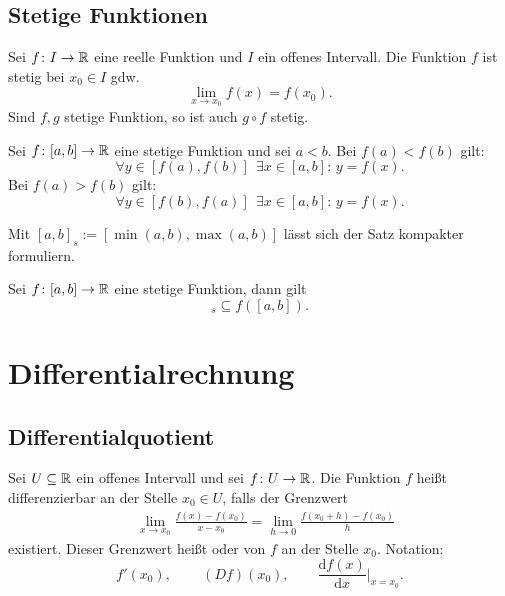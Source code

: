 \subsection{Stetige Funktionen}
Sei $f\colon I\to\mathbb R$ eine reelle Funktion und $I$ ein offenes
Intervall. Die Funktion $f$ ist stetig bei $x_0\in I$ gdw.
\begin{equation}
\lim_{x\to x_0} f(x)=f(x_0).
\end{equation}
Sind $f,g$ stetige Funktion, so ist auch $g\circ f$ stetig.

\begin{Satz}[Zwischenwertsatz]
Sei $f\colon [a,b]\to\mathbb R$ eine stetige Funktion und sei
$a<b$. Bei $f(a)<f(b)$ gilt:
\begin{equation}
\forall y{\in}[f(a),f(b)]\,\;\exists x{\in}[a,b]\colon\,y=f(x).
\end{equation}
Bei $f(a)>f(b)$ gilt:
\begin{equation}
\forall y{\in}[f(b),f(a)]\,\;\exists x{\in}[a,b]\colon\,y=f(x).
\end{equation}
\end{Satz}

\noindent
Mit $[a,b]_s := [\min(a,b),\max(a,b)]$ lässt sich der Satz
kompakter formuliern.
\begin{Satz}[Zwischenwertsatz]
Sei $f\colon [a,b]\to\mathbb R$ eine stetige Funktion, dann gilt
\begin{equation}
[a,b]_s \subseteq f([a,b]).
\end{equation}
\end{Satz}

\section{Differentialrechnung}
\subsection{Differentialquotient}
\begin{definition}[Differentialquotient]\mbox{}\newline
Sei $U\subseteq\mathbb R$ ein offenes Intervall
und sei $f\colon U\to\mathbb R$. Die Funktion $f$ heißt
differenzierbar
an der Stelle $x_0\in U$, falls der Grenzwert
\begin{equation}
\begin{split}
&\lim_{x\to x_0} \frac{f(x)-f(x_0)}{x-x_0}
= \lim_{h\to 0}\frac{f(x_0+h)-f(x_0)}{h}
\end{split}
\end{equation}
existiert. Dieser Grenzwert heißt
 oder 
von $f$ an der Stelle $x_0$. Notation:
\begin{equation}
f'(x_0),\,\qquad (Df)(x_0),\qquad \frac{\mathrm df(x)}{\mathrm dx}\Big|_{x=x_0}.
\end{equation}
\end{definition}

